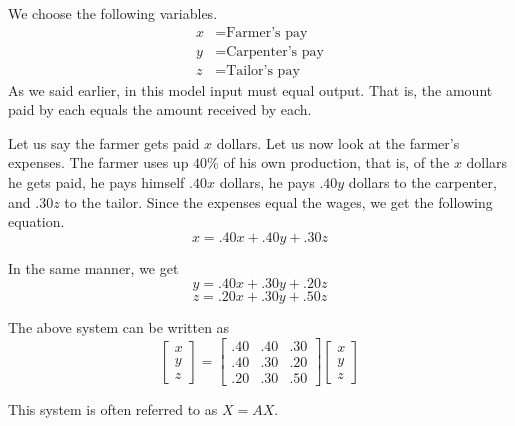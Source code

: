 \begin{solution}
    We choose the following variables.
    \[
        \begin{aligned}
            x & = \text{Farmer's pay}    \\
            y & = \text{Carpenter's pay} \\
            z & = \text{Tailor's pay}
        \end{aligned}
    \]
    As we said earlier, in this model input must equal output. That is, the amount paid by each equals the amount received by each.

    Let us say the farmer gets paid \( x \) dollars. Let us now look at the farmer's expenses. The farmer uses up \( 40\% \) of his own production, that is, of the \( x \) dollars he gets paid, he pays himself \( .40x \) dollars, he pays \( .40y \) dollars to the carpenter, and \( .30z \) to the tailor. Since the expenses equal the wages, we get the following equation.
    \[ x = .40x + .40y + .30z \]

    In the same manner, we get
    \[ y = .40x + .30y + .20z \]
    \[ z = .20x + .30y + .50z \]

    The above system can be written as
    \[ \begin{bmatrix}
            x \\
            y \\
            z
        \end{bmatrix} = \begin{bmatrix}
            .40 & .40 & .30 \\
            .40 & .30 & .20 \\
            .20 & .30 & .50
        \end{bmatrix} \begin{bmatrix}
            x \\
            y \\
            z
        \end{bmatrix} \]

    This system is often referred to as \( X = AX \).


\end{solution}
